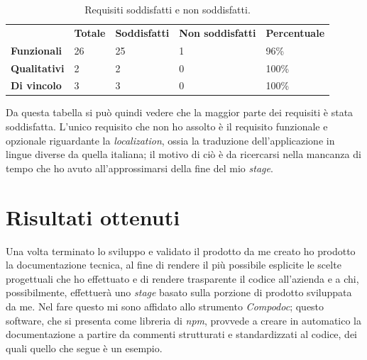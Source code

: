 \begin{table}[h]
  \label{tab:totale-requisiti-soddifatti}
  \begin{center}
    \begin{tabularx}{\textwidth}{lllll}
& \textbf{Totale}         & \textbf{Soddisfatti}    & \textbf{Non soddisfatti} & \textbf{Percentuale}       \\ \cline{2-5}
\multicolumn{1}{l|}{\textbf{Funzionali}}  & \multicolumn{1}{l|}{26} & \multicolumn{1}{l|}{25} & \multicolumn{1}{l|}{1}   & \multicolumn{1}{l|}{96\%}  \\ \cline{2-5}
\multicolumn{1}{l|}{\textbf{Qualitativi}} & \multicolumn{1}{l|}{2}  & \multicolumn{1}{l|}{2}  & \multicolumn{1}{l|}{0}   & \multicolumn{1}{l|}{100\%} \\ \cline{2-5}
\multicolumn{1}{l|}{\textbf{Di vincolo}}  & \multicolumn{1}{l|}{3}  & \multicolumn{1}{l|}{3}  & \multicolumn{1}{l|}{0}   & \multicolumn{1}{l|}{100\%} \\ \cline{2-5}
\end{tabularx}
\end{center}
\caption{Requisiti soddisfatti e non soddisfatti.}
\end{table}

Da questa tabella si può quindi vedere che la maggior parte dei requisiti è stata soddisfatta. L'unico requisito che non ho assolto è il requisito funzionale e opzionale riguardante la \textit{localization}, ossia la traduzione dell'applicazione in lingue diverse da quella italiana; il motivo di ciò è da ricercarsi nella mancanza di tempo che ho avuto all'approssimarsi della fine del mio \textit{stage}.


\section{Risultati ottenuti}

Una volta terminato lo sviluppo e validato il prodotto da me creato ho prodotto la documentazione tecnica, al fine di rendere il più possibile esplicite le scelte progettuali che ho effettuato e di rendere trasparente il codice all'azienda e a chi, possibilmente, effettuerà uno \textit{stage} basato sulla porzione di prodotto sviluppata da me. Nel fare questo mi sono affidato allo strumento \textit{Compodoc}; questo software, che si presenta come libreria di \textit{npm}, provvede a creare in automatico la documentazione a partire da commenti strutturati e standardizzati al codice, dei quali quello che segue è un esempio.\\

